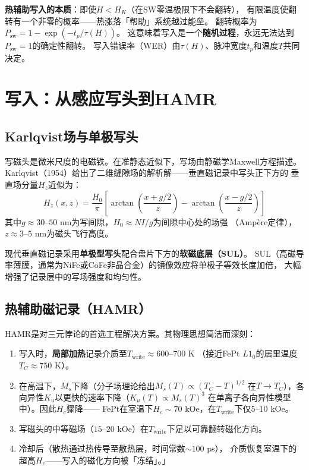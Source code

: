 \documentclass[11pt,a4paper,openany]{book}
\theoremstyle{definition}
\theoremstyle{plain}
\theoremstyle{remark}
\begin{document}
\textbf{热辅助写入的本质}：即使$H < H_K$（在SW零温极限下不会翻转），
有限温度使翻转有一个非零的概率——热涨落「帮助」系统越过能垒。
翻转概率为$P_{\text{sw}} = 1 - \exp(-t_p/\tau(H))$。
这意味着写入是一个\textbf{随机过程}，永远无法达到$P_{\text{sw}} = 1$的确定性翻转。
写入错误率（WER）由$\tau(H)$、脉冲宽度$t_p$和温度$T$共同决定。

\section{写入：从感应写头到HAMR}

\subsection{Karlqvist场与单极写头}

写磁头是微米尺度的电磁铁。在准静态近似下，写场由静磁学Maxwell方程描述。
Karlqvist（1954）给出了二维缝隙场的解析解——垂直磁记录中写头正下方的
垂直场分量$H_z$近似为：
\begin{equation}\label{eq:karlqvist}
  H_z(x,z) = \frac{H_0}{\pi}\left[
    \arctan\!\left(\frac{x + g/2}{z}\right)
    - \arctan\!\left(\frac{x - g/2}{z}\right)
  \right]
\end{equation}
其中$g \approx 30$--$50$ nm为写间隙，$H_0 \approx NI/g$为间隙中心处的场强
（Amp\`{e}re定律），$z \approx 3$--$5$ nm为磁头飞行高度。

现代垂直磁记录采用\textbf{单极型写头}配合盘片下方的\textbf{软磁底层（SUL）}。
SUL（高磁导率薄膜，通常为NiFe或CoFe非晶合金）的镜像效应将单极子等效长度加倍，
大幅增强了记录层中的写场强度和均匀性。

\subsection{热辅助磁记录（HAMR）}
\label{sec:hamr}

HAMR是对三元悖论的首选工程解决方案。其物理思想简洁而深刻：
\begin{enumerate}
  \item 写入时，\textbf{局部加热}记录介质至$T_{\text{write}} \approx 600$--$700$ K
  （接近FePt $L1_0$的居里温度$T_C \approx 750$ K）。
  \item 在高温下，$M_s$下降（分子场理论给出$M_s(T) \propto (T_C - T)^{1/2}$
  在$T \to T_C$），各向异性$K_u$以更快的速率下降（$K_u(T) \propto M_s(T)^3$
  在单离子各向异性模型中）。因此$H_c$骤降——
  FePt在室温下$H_c \sim 70$ kOe，在$T_{\text{write}}$下仅$5$--$10$ kOe。
  \item 写磁头的中等磁场（$15$--$20$ kOe）在$T_{\text{write}}$下足以可靠翻转磁化方向。
  \item 冷却后（散热通过热传导至散热层，时间常数$\sim 100$ ps），
  介质恢复室温下的超高$H_c$——写入的磁化方向被「冻结」。」
\end{enumerate}
\end{document}
